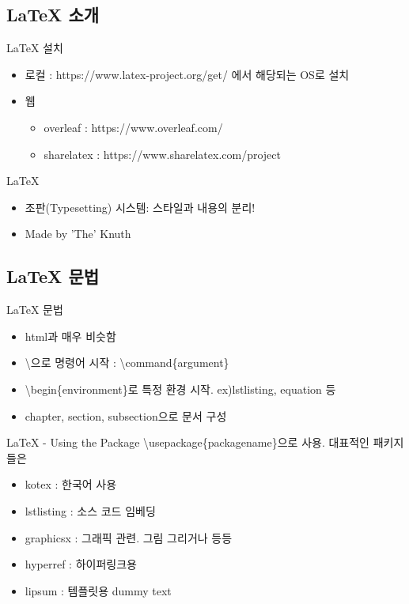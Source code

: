 \documentclass{beamer}
\begin{document}
\subsection{LaTeX 소개} 


\begin{frame}{LaTeX 설치}
\begin{itemize}
\item 로컬 : https://www.latex-project.org/get/ 에서 해당되는 OS로 설치 
\item 웹 
\begin{itemize}
\item overleaf : https://www.overleaf.com/
\item sharelatex : https://www.sharelatex.com/project
\end{itemize}
\end{itemize}
\end{frame}

\begin{frame}{LaTeX}
\begin{itemize}
\item 조판(Typesetting) 시스템: 스타일과 내용의 분리!     
\item Made by 'The' Knuth 
\end{itemize}
\end{frame}

\subsection{LaTeX 문법} 


\begin{frame}{LaTeX 문법}
\begin{itemize} 
\item html과 매우 비슷함 
\item \textbackslash 으로 명령어 시작 : \textbackslash command\{argument\}
\item \textbackslash begin\{environment\}로 특정 환경 시작. ex)lstlisting, equation 등
\item chapter, section, subsection으로 문서 구성 
\end{itemize}
\end{frame}

\begin{frame}{LaTeX - Using the Package} 
\textbackslash usepackage\{packagename\}으로 사용. 대표적인 패키지들은
\begin{itemize} 
\item kotex : 한국어 사용
\item lstlisting : 소스 코드 임베딩 
\item graphicsx : 그래픽 관련. 그림 그리거나 등등 
\item hyperref : 하이퍼링크용 
\item lipsum : 템플릿용 dummy text 
\end{itemize}
\end{frame} 
\end{document}
